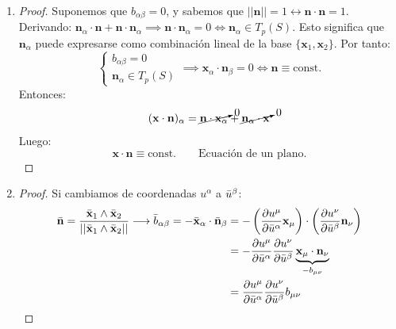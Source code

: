 \begin{enumerate}
    \item[\fbox{1}] 
    \begin{proof}
            Suponemos que $b_{\alpha \beta }=0$, y sabemos que $||\mathbf{n}||=1 \leftrightarrow \mathbf{n}\cdot \mathbf{n}=1$. Derivando: $\mathbf{n}_\alpha \cdot \mathbf{n}+\mathbf{n} \cdot \mathbf{n}_\alpha\implies \mathbf{n}\cdot \mathbf{n}_\alpha =0 \iff \mathbf{n}_\alpha \in T_p(S)$. Esto significa que $\mathbf{n}_\alpha $ puede expresarse como combinación lineal de la base $\{ \mathbf{x}_1,\mathbf{x}_2 \} $. Por tanto:
            $$
            \left \{ \begin{array}{c}
                 b_{\alpha \beta }=0  \\
                 \mathbf{n}_\alpha \in T_p(S) 
            \end{array} \right . \implies \mathbf{x}_\alpha \cdot \mathbf{n}_\beta =0\iff \mathbf{n}\equiv \text{const.} 
            $$
            Entonces:
            $$
            (\mathbf{x}\cdot \mathbf{n})_\alpha =\cancelto{0}{\mathbf{n}\cdot \mathbf{x}_\alpha }+\cancelto{0}{\mathbf{n}_\alpha \cdot \mathbf{x}}
            $$
            Luego:
            $$
            \mathbf{x}\cdot \mathbf{n}\equiv \text{const.}\qquad \text{Ecuación de un plano.} 
            $$
    \end{proof}
    \item[\fbox{2}]
    \begin{proof}
        Si cambiamos de coordenadas $u^\alpha $ a $\Bar{u}^\beta $:
        \begin{equation*}
        \begin{split}
            \Bar{\mathbf{n}}=\frac{\Bar{\mathbf{x}}_1\wedge \Bar{\mathbf{x}}_2}{||\Bar{\mathbf{x}}_1\wedge \Bar{\mathbf{x}}_2||}\longrightarrow \Bar{b}_{\alpha \beta }=-\Bar{\mathbf{x}}_\alpha \cdot \Bar{\mathbf{n}}_\beta &=-\left ( \pdv{u^\mu }{\Bar{u}^\alpha } \mathbf{x}_\mu \right ) \cdot \left ( \pdv{u^\nu }{\Bar{u}^\beta } \mathbf{n}_\nu \right )\\
            &=- \pdv{u^\mu }{\Bar{u}^\alpha }\pdv{u^\nu }{\Bar{u}^\beta }\underbrace{\mathbf{x}_\mu\cdot \mathbf{n}_\nu}_{-b_{\mu \nu }}\\
            &=\pdv{u^\mu }{\Bar{u}^\alpha }\pdv{u^\nu }{\Bar{u}^\beta }b_{\mu \nu }
        \end{split}
        \end{equation*}
    \end{proof}
\end{enumerate}
